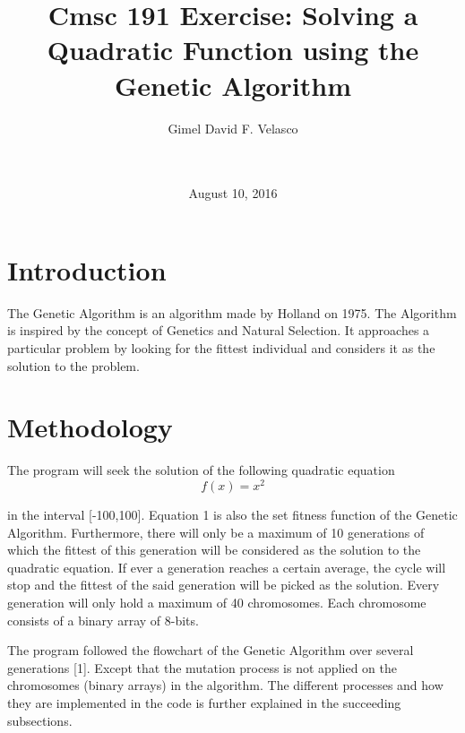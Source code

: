 \documentclass{acm_proc_article-sp}
\begin{document}
\title{Cmsc 191 Exercise: Solving a Quadratic Function using the Genetic Algorithm}

\author{
\alignauthor
    Gimel David F. Velasco\\
    \\
    \\
}

\date{August 10, 2016}

\maketitle


\section{Introduction}
The Genetic Algorithm is an algorithm made by Holland on 1975. The Algorithm is inspired by the concept of Genetics and Natural Selection. It approaches a particular problem by looking for the fittest individual and considers it as the solution to the problem.

\section{Methodology}
The program will seek the solution of the following quadratic equation
\begin{equation}
f(x) = x^2
\end{equation}

in the interval [-100,100]. Equation 1 is also the set fitness function of the Genetic Algorithm. Furthermore, there will only be a maximum of 10 generations of which the fittest of this generation will be considered as the solution to the quadratic equation. If ever a generation reaches a certain average, the cycle will stop and the fittest of the said generation will be picked as the solution. Every generation will only hold a maximum of 40 chromosomes. Each chromosome consists of a binary array of 8-bits.

The program followed the flowchart of the Genetic Algorithm over several generations [1]. Except that the mutation process is not applied on the chromosomes (binary arrays) in the algorithm. The different processes and how they are implemented in the code is further explained in the succeeding subsections.
\end{document}
